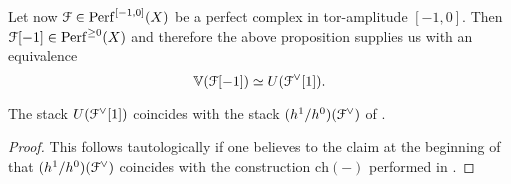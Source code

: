Let now $\mathcal F \in \mathrm{Perf}^{[-1,0]}(X)$ be a perfect complex in tor-amplitude $[-1,0]$.
Then $\mathcal F[-1] \in \mathrm{Perf}^{\ge 0}(X)$ and therefore the above proposition supplies us with an equivalence
\[ \mathbb V(\mathcal F[-1]) \simeq U(\mathcal F^\vee[1]) . \]

\begin{prop}
	The stack $U(\mathcal F^\vee [1])$ coincides with the stack $(h^1 / h^0)(\mathcal F^\vee)$ of \cite{Behrend_Intrinsic_normal_cone_1997}.
\end{prop}

\begin{proof}
	This follows tautologically if one believes to the claim at the beginning of \cite[\S 2]{Behrend_Intrinsic_normal_cone_1997} that $(h^1 / h^0)(\mathcal F^\vee)$ coincides with the construction $\mathrm{ch}(-)$ performed in \cite[Expos\'e XVIII, \S 1.4]{SGA4}.
\end{proof}